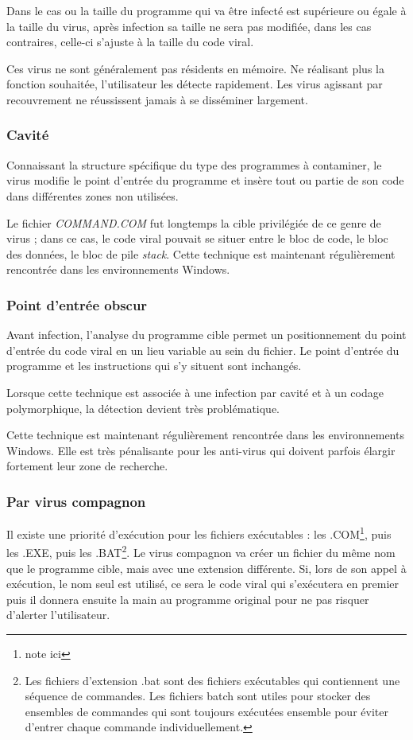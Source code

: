         Dans le cas ou la taille du programme qui va être infecté est supérieure ou égale à la taille du virus, 
        après infection sa taille ne sera pas modifiée, dans les cas contraires, 
        celle-ci s’ajuste à la taille du code viral.

        Ces virus ne sont généralement pas résidents en mémoire. Ne réalisant plus la fonction souhaitée, 
        l’utilisateur les détecte rapidement. Les virus agissant par recouvrement ne réussissent jamais 
        à se disséminer largement.

        \subsubsection{Cavité}
        Connaissant la structure spécifique du type des programmes à contaminer, le virus modifie le point 
        d'entrée du programme et insère tout ou partie de son code dans différentes zones non utilisées. 
        
        Le fichier \emph{COMMAND.COM} fut longtemps la cible privilégiée de ce genre de virus ; 
        dans ce cas, le code viral pouvait se situer entre le bloc de code, le bloc des données, le bloc de pile 
        \emph{stack}. Cette technique est maintenant régulièrement rencontrée dans les environnements Windows.

        \subsubsection{Point d'entrée obscur}
        Avant infection, l'analyse du programme cible permet un positionnement du point d'entrée du code 
        viral en un lieu variable au sein du fichier. Le point d’entrée du programme et les instructions qui 
        s’y situent sont inchangés.

        Lorsque cette technique est associée à une infection par cavité et à un codage polymorphique, 
        la détection devient très problématique.

        Cette technique est maintenant régulièrement rencontrée dans les environnements Windows. 
        Elle est très pénalisante pour les anti-virus qui doivent parfois élargir fortement leur zone de recherche.

        \subsubsection{Par virus compagnon}
        Il existe une priorité d'exécution pour les fichiers exécutables : les .COM\footnote{note ici}, puis les .EXE, 
        puis les .BAT\footnote{Les fichiers d'extension .bat sont des fichiers exécutables qui contiennent une 
        séquence de commandes. Les fichiers batch sont utiles pour stocker des ensembles de commandes qui sont 
        toujours exécutées ensemble pour éviter d’entrer chaque commande individuellement.}.
        Le virus compagnon va créer un fichier du même nom que le programme cible, 
        mais avec une extension différente. Si, lors de son appel à exécution, le nom seul est utilisé, 
        ce sera le code viral qui s’exécutera en premier puis il donnera ensuite la main au programme 
        original pour ne pas risquer d’alerter l’utilisateur.

